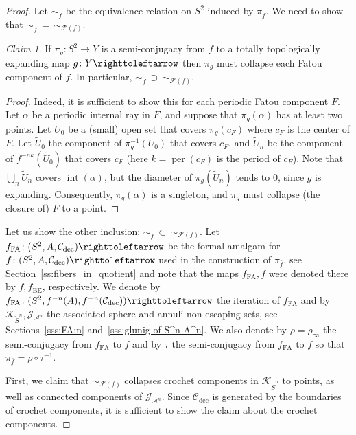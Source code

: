 \documentclass{amsart}
\theoremstyle{plain}
\theoremstyle{definition}
\theoremstyle{remark}
\newtheorem*{claim}{Claim}
\renewcommand{\AA}{{\mathcal A}}
\newcommand{\filled}{{\mathcal K}}
\newcommand{\per}{{\operatorname{per}}}
\newcommand{\Fat}{{\mathcal F}}
\newcommand{\Jul}{{\mathcal J}}
\newcommand{\KC}{{\mathcal K}}
\newcommand{\CC}{{\mathcal C}}
\newcommand\selfmap{\righttoleftarrow}
\newcommand{\cro}{{\operatorname{dec}}}
\begin{document}
\begin{proof} Let $\sim_{\bar f}$ be the equivalence relation on $S^2$ induced by $\pi_{\bar f}$.  We need to show that $\sim_{\bar f} \, = \, \sim_{\Fat(f)}$.

\begin{claim}
If $\pi_g\colon S^2\to Y$ is a semi-conjugacy from $f$ to a totally topologically expanding map $g\colon Y\selfmap$ then $\pi_g$ must collapse each Fatou component of $f$.  In particular, $\sim_{\bar f}\,  \supset \,\sim_{\Fat(f)}$.
\end{claim}
\begin{proof}
Indeed, it is sufficient to show this for each periodic Fatou component $F$.  Let $\alpha$ be a periodic internal ray in $F$, and suppose that $\pi_g(\alpha)$ has at least two points.  Let $U_0$ be a (small) open set that covers $\pi_g(c_F)$ where $c_F$ is the center of $F$.  Let $\widetilde U_0$ the component of $\pi_g^{-1}(U_0)$ that covers $c_F$, and $\widetilde U_n$ be the component of $f^{-nk}(\widetilde U_0)$ that covers $c_F$ (here $k=\per(c_F)$ is the period of $c_F$).  Note that $\bigcup_n \widetilde U_n$ covers $\operatorname{int}(\alpha)$,  but the diameter of $\pi_g( \widetilde U_n)$ tends to $0$, since $g$ is expanding.  Consequently, $\pi_g(\alpha)$ is a singleton, and $\pi_g$ must collapse (the closure of) $F$ to a point.  %
\end{proof}


Let us show the other inclusion: $\sim_{\bar f}\,  \subset \,\sim_{\Fat(f)}$. Let $f_\text{FA}\colon (S^2,A, \CC_\cro)\selfmap$ be the formal amalgam for $f\colon (S^2,A, \CC_\cro)\selfmap$ used in the construction of $\pi_{\bar f}$, see Section~\ref{ss:fibers_in_quotient} and note that the maps $f_\text{FA},f$ were denoted there by $f, f_\text{BE}$, respectively. We denote by $f_\text{FA}\colon (S^2,f^{-n}(A), f^{-n}(\CC_\cro))\selfmap$ the iteration of $f_\text{FA}$ and by $\filled_{\widetilde S^n}, \Jul_{\AA^n}$ the associated sphere and annuli non-escaping sets, see Sections~\ref{sss:FA:n} and~\ref{sss:glunig of S^n A^n}. We also denote by $\rho=\rho_\infty$ the semi-conjugacy from $f_\text{FA}$ to $\bar f$ and by $\tau$ the semi-conjugacy from $f_\text{FA}$ to $f$ so that $\pi_{\bar f}=\rho\circ \tau^{-1}$.


First, we claim that $\sim_{\Fat(f)}$ collapses crochet components in $\KC_{\widetilde S^n}$ to points, as well as connected components of $ \Jul_{\AA^{n}}$. Since $\CC_\cro$ is generated by the boundaries of crochet components, it is sufficient to show the claim about the crochet components.



\end{proof}
\end{document}
